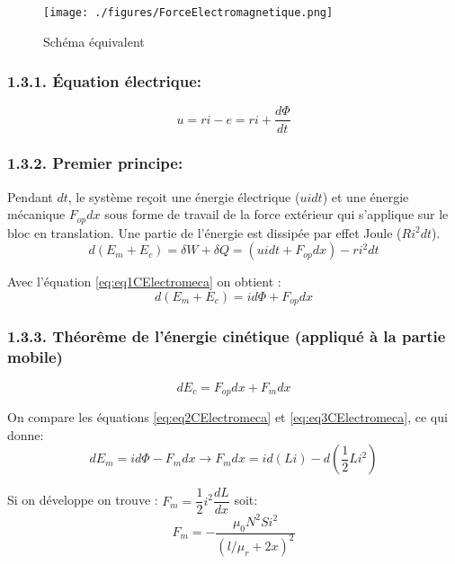 \documentclass[french, a4paper, 10pt, twocolumn, landscape]{article}
\begin{document}
\begin{figure}[ht]
	\centering
	\texttt{[image: ./figures/ForceElectromagnetique.png]}
	\caption{Schéma équivalent}
\end{figure}

\subsubsection*{1.3.1. Équation électrique:}
\begin{equation}
	u = ri -e = ri +\dfrac{d\Phi}{dt} \label{eq:eq1CElectromeca}
\end{equation}

\subsubsection*{1.3.2. Premier principe: }
Pendant $dt$, le système reçoit une énergie électrique ($uidt$) et une énergie mécanique $F_{op}dx$ sous forme de travail de la force extérieur qui s'applique sur le bloc en translation. Une partie de l'énergie est dissipée par effet Joule ($Ri^2dt$).
\begin{equation}
	d(E_m+E_c) = \delta W + \delta Q = (uidt+F_{op}dx)-ri^2dt
\end{equation}

Avec l'équation \eqref{eq:eq1CElectromeca} on obtient : 
\begin{equation}
	d(E_m+E_c) = id \Phi+F_{op}dx \label{eq:eq2CElectromeca}
\end{equation}

\subsubsection*{1.3.3. Théorême de l'énergie cinétique (appliqué à la partie mobile)}
\begin{equation}
	dE_c=F_{op}dx+F_{m}dx \label{eq:eq3CElectromeca}
\end{equation}

On compare les équations \eqref{eq:eq2CElectromeca} et \eqref{eq:eq3CElectromeca}, ce qui donne: 
\begin{equation}
	dE_m = id\Phi-F_{m}dx \rightarrow F_{m}dx = id(Li)-d(\dfrac{1}{2}Li^2) \label{eq:eq4CElectromeca}
\end{equation}

Si on développe on trouve : $F_{m}= \dfrac{1}{2}i^2\dfrac{dL}{dx}$ soit:
\begin{equation}
	F_{m} = -\dfrac{\mu_0N^2Si^2}{\left(l/\mu_r+2x\right)^2}
\end{equation}
\end{document}
